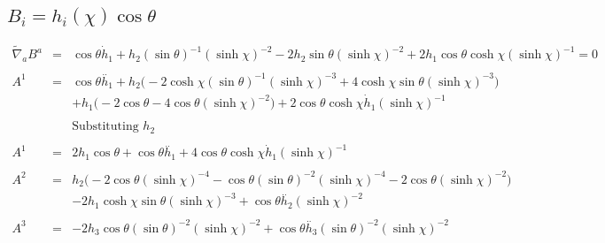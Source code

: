 \documentclass[10pt,letterpaper]{article}
\numberwithin{equation}{section}
\begin{document}
\subsection{$B_i = h_i(\chi)\cos\theta$}
\begin{eqnarray}
\tilde\nabla_a B^a &=& \cos\theta \dot{h}_{1} + h_{2} (\sin\theta)^{-1} (\sinh\chi)^{-2} - 2 h_{2} \sin\theta (\sinh\chi)^{-2} + 2 h_{1} \cos\theta \cosh\chi (\sinh\chi)^{-1}=0
\\ \nonumber\\
A^{1}&=& \cos\theta \overset{..}{h}_{1} + h_{2} \bigl(-2 \cosh\chi (\sin\theta)^{-1} (\sinh\chi)^{-3} + 4 \cosh\chi \sin\theta (\sinh\chi)^{-3}\bigr) \nonumber \\ 
&& + h_{1} \bigl(-2 \cos\theta - 4 \cos\theta (\sinh\chi)^{-2}\bigr) + 2 \cos\theta \cosh\chi \dot{h}_{1} (\sinh\chi)^{-1}
\\ \nonumber\\
&&\text{Substituting $h_2$}
\\ \nonumber\\
A^{1}&=& 2 h_{1} \cos\theta + \cos\theta \overset{..}{h}_{1} + 4 \cos\theta \cosh\chi \dot{h}_{1} (\sinh\chi)^{-1}
\\ \nonumber\\
A^{2}&=& h_{2} \bigl(-2 \cos\theta (\sinh\chi)^{-4} -  \cos\theta (\sin\theta)^{-2} (\sinh\chi)^{-4} - 2 \cos\theta (\sinh\chi)^{-2}\bigr) \nonumber \\ 
&& - 2 h_{1} \cosh\chi \sin\theta (\sinh\chi)^{-3} + \cos\theta \overset{..}{h}_{2} (\sinh\chi)^{-2}
\\ \nonumber\\
A^{3}&=& -2 h_{3} \cos\theta (\sin\theta)^{-2} (\sinh\chi)^{-2} + \cos\theta \overset{..}{h}_{3} (\sin\theta)^{-2} (\sinh\chi)^{-2}
\end{eqnarray}
\end{document}
